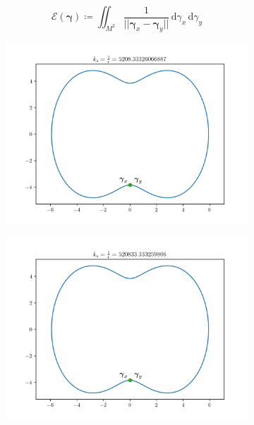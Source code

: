\documentclass{beamer}
\theoremstyle{remark}
\newcommand{\gammabf}{\boldsymbol{\gamma}}
\newcommand{\intd}{\, \text{d}}
\newcommand{\norm}[1]{\lvert \lvert #1 \rvert \rvert}
\begin{document}
\begin{frame}
        \begin{equation*}
            \mathcal{E} \left( \gammabf \right) \coloneqq \iint_{M^2} \frac{1}{\norm{\gammabf_x - \gammabf_y}} \intd \gamma_x \intd \gamma_y
        \end{equation*}
        \begin{figure}[h]
            \centering
            \begin{subfigure}[b]{0.45\textwidth}
                \centering
                \includegraphics[width=\textwidth]{simple-2}
            \end{subfigure}
            \begin{subfigure}[b]{0.45\textwidth}
                \centering
                \includegraphics[width=\textwidth]{simple-3}
            \end{subfigure}
        \end{figure}
\end{frame}
\end{document}

